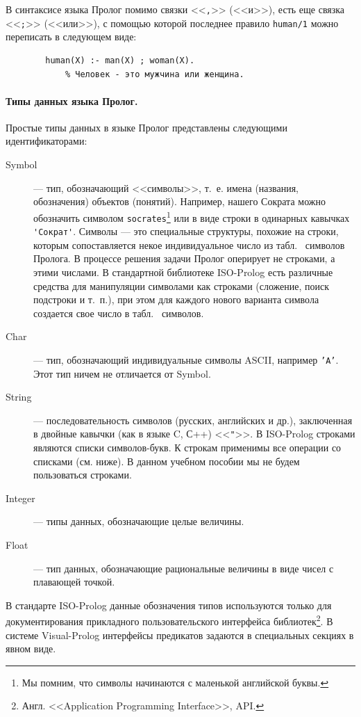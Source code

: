 \documentclass[12pt, openany, twoside]{book} %
\begin{document}
В синтаксисе языка Пролог помимо связки <<{\tt ,}>> (<<и>>), есть еще связка <<{\tt ;}>> (<<или>>), с помощью которой последнее правило {\tt human/1} можно переписать в следующем виде:
{\tt\begin{verbatim}
        human(Х) :- man(Х) ; woman(Х).
            % Человек - это мужчина или женщина.
\end{verbatim}}

\paragraph{Типы данных языка Пролог.} Простые типы данных в языке Пролог представлены следующими идентификаторами:
\begin{description}
\item[Symbol] --- тип, обозначающий <<символы>>, т.~е. имена (названия, обозначения) объектов (понятий). Например, нашего Сократа можно обозначить символом {\tt socrates}\footnote{Мы помним, что символы начинаются с маленькой английской буквы.} или в виде строки в одинарных кавычках {\tt \verb|'Сократ'|}. Символы --- это специальные структуры, похожие на строки, которым сопоставляется некое индивидуальное число из табл.~ символов Пролога. В процессе решения задачи Пролог оперирует не строками, а этими числами. В стандартной библиотеке ISO-Prolog есть различные средства для манипуляции символами как строками (сложение, поиск подстроки и т.~п.), при этом для каждого нового варианта символа создается свое число в табл.~ символов.

\item[Char] --- тип, обозначающий индивидуальные символы ASCII, например {\tt 'A'}. Этот тип ничем не отличается от Symbol.

\item[String] --- последовательность символов (русских, английских и др.), заключенная в двойные кавычки (как в языке C, С++) <<{\tt \verb|"|}>>. В ISO-Prolog строками являются списки символов-букв. К строкам применимы все операции со списками (см. ниже). В данном учебном пособии мы не будем пользоваться строками.

\item[Integer] --- типы данных, обозначающие целые величины.

\item[Float] --- тип данных, обозначающие рациональные величины в виде чисел с плавающей точкой.
\end{description}
В стандарте ISO-Prolog данные обозначения типов используются только для документирования прикладного пользовательского интерфейса библиотек\footnote{Англ. <<Application Programming Interface>>, API.}. В системе Visual-Prolog интерфейсы предикатов задаются в специальных секциях в явном виде.
\end{document}
